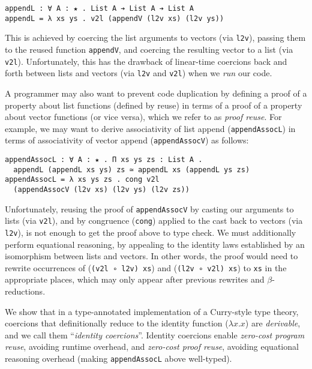 \documentclass[a4paper,envcountsame,envcountsect]{llncs}
\begin{document}
\begin{verbatim}
appendL : ∀ A : ★ . List A ➔ List A ➔ List A
appendL = λ xs ys . v2l (appendV (l2v xs) (l2v ys))
\end{verbatim}

This is achieved by coercing the list arguments to vectors
(via \texttt{l2v}), passing
them to the reused function \texttt{appendV}, and coercing
the resulting vector to a list (via \texttt{v2l}).
Unfortunately, this has the drawback of linear-time coercions back and
forth between lists and vectors (via \texttt{l2v} and \texttt{v2l})
when we \textit{run} our code.

A programmer may also want to prevent code duplication by defining a
proof of a property about list functions (defined by reuse) in terms of a proof of a
property about vector functions (or vice versa), which we refer to as
\textit{proof reuse}. For example, we may want to derive associativity
of list append (\texttt{appendAssocL}) in terms of associativity
of vector append (\texttt{appendAssocV}) as follows:

\begin{verbatim}
appendAssocL : ∀ A : ★ . Π xs ys zs : List A .
  appendL (appendL xs ys) zs ≃ appendL xs (appendL ys zs)  
appendAssocL = λ xs ys zs . cong v2l 
  (appendAssocV (l2v xs) (l2v ys) (l2v zs))
\end{verbatim}

Unfortunately, reusing the proof of \texttt{appendAssocV} by casting
our arguments to lists (via \texttt{v2l}),
and by congruence (\texttt{cong}) applied to the
cast back to vectors (via \texttt{l2v}), is not
enough to get the proof above to type check. We must additionally
perform equational reasoning, by appealing to the identity laws
established by an isomorphism between lists and vectors. In other
words, the proof would need to rewrite occurrences of
(\texttt{(v2l ∘ l2v) xs}) and (\texttt{(l2v ∘ v2l) xs})
to \texttt{xs} in the appropriate places, which may only appear after
previous rewrites and $\beta$-reductions.

We show that in a type-annotated implementation of a Curry-style type
theory, coercions that definitionally reduce to the identity function
($\lambda x. x$)
are \textit{derivable}, and we call them ``\textit{identity coercions}''.
Identity coercions enable \textit{zero-cost program reuse}, avoiding
runtime overhead, and \textit{zero-cost proof reuse}, avoiding
equational reasoning overhead
(making \texttt{appendAssocL} above well-typed).
\end{document}

